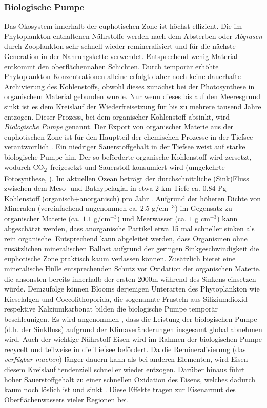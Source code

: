 \documentclass[12pt,a4paper,onecolumn]{scrartcl}
\newcommand{\cotwo}{CO\textsubscript{2}}
\begin{document}
\subsubsection{Biologische Pumpe} \label{sec:biopump}
Das Ökosystem innerhalb der euphotischen Zone ist höchst effizient. Die im Phytoplankton enthaltenen Nährstoffe werden nach dem Absterben oder \textit{Abgrasen} durch Zooplankton sehr schnell wieder remineralisiert und für die nächste Generation in der Nahrungskette verwendet. Entsprechend wenig Material entkommt den oberflächennahen Schichten. Durch temporär erhöhte Phytoplankton-Konzentrationen alleine erfolgt daher noch keine dauerhafte Archivierung des Kohlenstoffs, obwohl dieses zunächst bei der Photosynthese in organischem Material gebunden wurde. Nur wenn dieses bis auf den Meeresgrund sinkt ist es dem Kreislauf der Wiederfreisetzung für bis zu mehrere tausend Jahre entzogen. Dieser Prozess, bei dem organischer Kohlenstoff absinkt, wird \textit{Biologische Pumpe} genannt. Der Export von organischer Materie aus der euphotischen Zone ist für den Hauptteil der chemischen Prozesse in der Tiefsee verantwortlich \citep{Emerson.2009}. Ein niedriger Sauerstoffgehalt in der Tiefsee weist auf starke biologische Pumpe hin. Der so beförderte organische Kohlenstoff wird zersetzt, wodurch \cotwo \ freigesetzt und Sauerstoff konsumiert wird (umgekehrte Fotosynthese, \cite{Honjo.2008}). Im aktuellen Ozean beträgt der durchschnittliche (Sink)Fluss zwischen dem Meso- und Bathypelagial in etwa 2 km Tiefe ca. 0.84 Pg Kohlenstoff (organisch+anorganisch) pro Jahr \citep{Honjo.2008}. Aufgrund der höheren Dichte von Mineralen (vereinfachend angenommen ca. $2.5$ g/cm$^{-3}$) im Gegensatz zu organischer Materie (ca. $1.1$ g/cm$^{-3}$) und Meerwasser (ca. $1$ g cm$^{-3}$) kann abgeschätzt werden, dass anorganische Partikel etwa 15 mal schneller sinken als rein organische. Entsprechend kann abgeleitet werden, dass Organismen ohne zusätzlichen mineralischen Ballast aufgrund der geringen Sinkgeschwindigkeit die euphotische Zone praktisch kaum verlassen können. Zusätzlich bietet eine mineralische Hülle entsprechenden Schutz vor Oxidation der organischen Materie, die ansonsten bereits innerhalb der ersten 2000m während des Sinkens einsetzen würde\citep{Emerson.2009}. Demzufolge können Blooms derjenigen Unterarten des Phytoplankton wie Kieselalgen und Coccolithoporida, die sogenannte Frusteln aus Siliziumdioxid respektive Kalziumkarbonat bilden die biologische Pumpe temporär beschleunigen. Es wird angenommen , dass die Leistung der biologischen Pumpe (d.h. der Sinkfluss) aufgrund der Klimaveränderungen insgesamt global abnehmen wird. Auch der wichtige Nährstoff Eisen wird im Rahmen der biologischen Pumpe recycelt und teilweise in die Tiefsee befördert. Da die Remineralisierung (das \textit{verfügbar machen}) länger dauern kann als bei anderen Elementen, wird Eisen diesem Kreislauf tendenziell schneller wieder entzogen. Darüber hinaus führt hoher Sauerstoffgehalt zu einer schnellen Oxidation des Eisens, welches dadurch kaum noch löslich ist und sinkt \citep{Falkowski.1998}. Diese  Effekte tragen zur Eisenarmut des Oberflächenwassers vieler Regionen bei.
\end{document}
